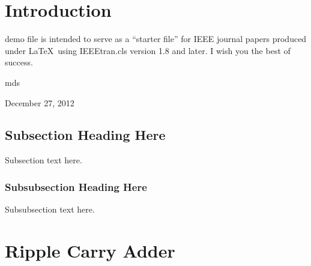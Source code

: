 \documentclass[journal]{IEEEtran}
\begin{document}
\begin{IEEEkeywords}

\end{IEEEkeywords}


%
\IEEEpeerreviewmaketitle



\section{Introduction}
%
%
%
%
 demo file is intended to serve as a ``starter file''
for IEEE journal papers produced under \LaTeX\ using
IEEEtran.cls version 1.8 and later.
I wish you the best of success.

\hfill mds

\hfill December 27, 2012

\subsection{Subsection Heading Here}
Subsection text here.


\subsubsection{Subsubsection Heading Here}
Subsubsection text here.
\section{Ripple Carry Adder}\label{section_RCA}
\end{document}
